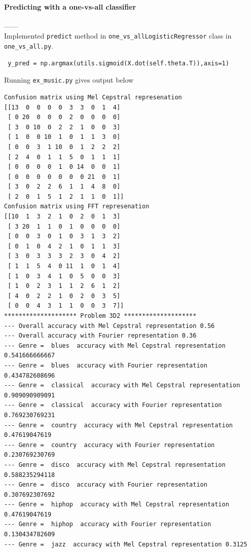 \documentclass{article}
\begin{document}
\paragraph{Predicting with a one-vs-all classifier\\}
------\\
Implemented \verb|predict| method in \verb|one_vs_allLogisticRegressor| class in \verb|one_vs_all.py|.
\begin{tiny}
\begin{lstlisting}
 y_pred = np.argmax(utils.sigmoid(X.dot(self.theta.T)),axis=1)
\end{lstlisting}
\end{tiny}
\newpage
Running \verb|ex_music.py| gives output below
\begin{tiny}
\begin{lstlisting}
Confusion matrix using Mel Cepstral represenation
[[13  0  0  0  0  3  3  0  1  4]
 [ 0 20  0  0  0  2  0  0  0  0]
 [ 3  0 10  0  2  2  1  0  0  3]
 [ 1  0  0 10  1  0  1  1  3  0]
 [ 0  0  3  1 10  0  1  2  2  2]
 [ 2  4  0  1  1  5  0  1  1  1]
 [ 0  0  0  0  1  0 14  0  0  1]
 [ 0  0  0  0  0  0  0 21  0  1]
 [ 3  0  2  2  6  1  1  4  8  0]
 [ 2  0  1  5  1  2  1  1  0  1]]
Confusion matrix using FFT represenation
[[10  1  3  2  1  0  2  0  1  3]
 [ 3 20  1  1  0  1  0  0  0  0]
 [ 0  0  3  0  1  0  3  1  3  2]
 [ 0  1  0  4  2  1  0  1  1  3]
 [ 3  0  3  3  3  2  3  0  4  2]
 [ 1  1  5  4  0 11  1  0  1  4]
 [ 1  0  3  4  1  0  5  0  0  3]
 [ 1  0  2  3  1  1  2  6  1  2]
 [ 4  0  2  2  1  0  2  0  3  5]
 [ 0  0  4  3  1  1  0  0  3  7]]
******************** Problem 3D2 ******************** 
--- Overall accuracy with Mel Cepstral representation 0.56
--- Overall accuracy with Fourier representation 0.36
--- Genre =  blues  accuracy with Mel Cepstral representation 0.541666666667
--- Genre =  blues  accuracy with Fourier representation 0.434782608696
--- Genre =  classical  accuracy with Mel Cepstral representation 0.909090909091
--- Genre =  classical  accuracy with Fourier representation 0.769230769231
--- Genre =  country  accuracy with Mel Cepstral representation 0.47619047619
--- Genre =  country  accuracy with Fourier representation 0.230769230769
--- Genre =  disco  accuracy with Mel Cepstral representation 0.588235294118
--- Genre =  disco  accuracy with Fourier representation 0.307692307692
--- Genre =  hiphop  accuracy with Mel Cepstral representation 0.47619047619
--- Genre =  hiphop  accuracy with Fourier representation 0.130434782609
--- Genre =  jazz  accuracy with Mel Cepstral representation 0.3125

\end{lstlisting}
\end{tiny}
\end{document}

